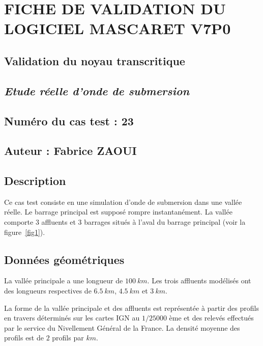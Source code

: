 \documentclass[a4paper,10pt]{article}
\begin{document}
\section*{FICHE DE VALIDATION DU LOGICIEL MASCARET V7P0}

\subsection*{Validation du noyau transcritique}

\subsection*{\emph{Etude réelle d'onde de submersion}}

\subsection*{Numéro du cas test : 23}

\subsection*{Auteur : Fabrice ZAOUI}



\vspace{1cm}

\subsection*{Description}

Ce cas test consiste en une simulation d'onde de submersion dans une vallée réelle. Le barrage principal est supposé rompre instantanément. La vallée comporte $3$ affluents et $3$ barrages situés à l'aval du barrage principal (voir la figure~\ref{fig1}).

\subsection*{Données géométriques}

La vallée principale a une longueur de $100\ km$. Les trois affluents modélisés ont des longueurs respectives de $6.5\ km$, $4.5\ km$ et $3\ km$. 

La forme de la vallée principale et des affluents est représentée à partir des profils en travers déterminés sur les cartes IGN au $1/25000$ ème et des relevés effectués par le service du Nivellement Général de la France. La densité moyenne des profils est de $2$ profils par $km$.
\end{document}
